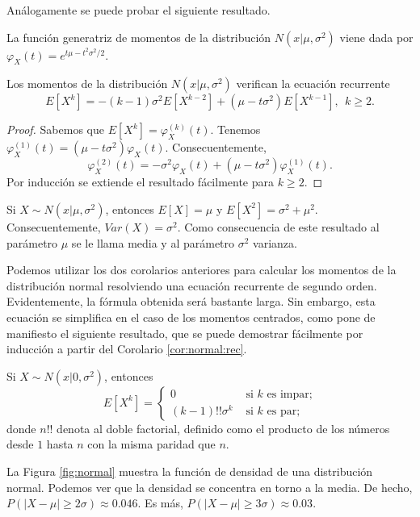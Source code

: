 \documentclass{article}
\begin{document}
Análogamente se puede probar el siguiente resultado.

\begin{prop} \label{prop:normal:gm}
    La función generatriz de momentos de la distribución $N(x|\mu, \sigma^2)$ viene dada por $\varphi_X(t) = e^{t\mu - t^2 \sigma^2 / 2}$.
\end{prop}

\begin{cor} \label{cor:normal:rec}
    Los momentos de la distribución $N(x|\mu,\sigma^2)$ verifican la ecuación recurrente
    \[E[X^k] = -(k-1)\sigma^2 E[X^{k-2}] + (\mu - t \sigma^2) E[X^{k-1}], \ \  k \ge 2.\]
\end{cor}
\begin{proof}
    Sabemos que $E[X^k] = \varphi_X^{(k)}(t)$. Tenemos $\varphi_X^{(1)}(t) = (\mu - t \sigma^2) \varphi_X(t)$. Consecuentemente,
    \[\varphi_X^{(2)}(t) = -\sigma^2 \varphi_X(t) + (\mu - t \sigma^2) \varphi_X^{(1)}(t).\]
    Por inducción se extiende el resultado fácilmente para $k \ge 2$.
\end{proof}

\begin{cor}
    Si $X \sim N(x|\mu,\sigma^2)$, entonces $E[X] = \mu$ y $E[X^2] = \sigma^2 + \mu^2$. Consecuentemente, $Var(X) = \sigma^2$. Como consecuencia de este resultado al parámetro $\mu$ se le llama media y al parámetro $\sigma^2$ varianza.
\end{cor}

Podemos utilizar los dos corolarios anteriores para calcular los momentos de la distribución normal resolviendo una ecuación recurrente de segundo orden. Evidentemente, la fórmula obtenida será bastante larga. Sin embargo, esta ecuación se simplifica en el caso de los momentos centrados, como pone de manifiesto el siguiente resultado, que se puede demostrar fácilmente por inducción a partir del Corolario \ref{cor:normal:rec}.

\begin{cor}
    Si $X \sim N(x|0,\sigma^2)$, entonces
    \[E[X^k] = \begin{cases} 0 & \text{ si } k \text{ es impar;} \\ (k-1)!! \sigma^{k} & \text{ si } k \text{ es par;} \end{cases}\]
    donde $n!!$ denota al doble factorial, definido como el producto de los números desde $1$ hasta $n$ con la misma paridad que $n$.
\end{cor}

La Figura \ref{fig:normal} muestra la función de densidad de una distribución normal. Podemos ver que la densidad se concentra en torno a la media. De hecho, $P(|X - \mu| \ge 2\sigma) \approx 0.046$. Es más, $P(|X - \mu| \ge 3\sigma) \approx 0.03$.
\end{document}

